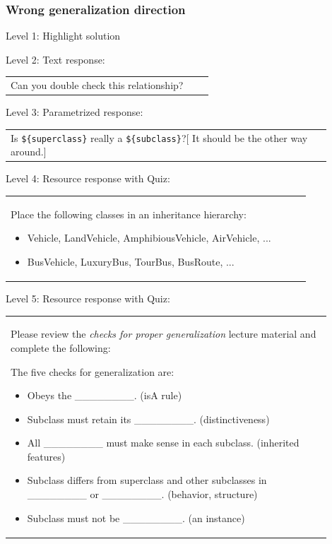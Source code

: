 \subsubsection{Wrong generalization direction}

\noindent Level 1: Highlight solution  \medskip

\noindent Level 2: Text response: \medskip

\begin{tabular}{|p{0.9\linewidth}}
Can you double check this relationship?
\end{tabular} \medskip

\noindent Level 3: Parametrized response: \medskip

\begin{tabular}{|p{0.9\linewidth}}
Is \verb|${superclass}| really a \verb|${subclass}|?[ It should be the other way around.]
\end{tabular} \medskip

\noindent Level 4: Resource response with Quiz: \medskip

\begin{tabular}{|p{0.9\linewidth}}
Place the following classes in an inheritance hierarchy:

\begin{itemize}
    \item Vehicle, LandVehicle, AmphibiousVehicle, AirVehicle, ...
    \item BusVehicle, LuxuryBus, TourBus, BusRoute, ...
\end{itemize}

\end{tabular} \medskip

\noindent Level 5: Resource response with Quiz: \medskip

\begin{tabular}{|p{0.9\linewidth}}
Please review the \textit{checks for proper generalization} lecture material
and complete the following:

The five checks for generalization are:
\begin{itemize}
    \item Obeys the \_\_\_\_\_\_\_\_. (isA rule)
    \item Subclass must retain its \_\_\_\_\_\_\_\_. (distinctiveness)
    \item All \_\_\_\_\_\_\_\_ must make sense in each subclass. (inherited features)
    \item Subclass differs from superclass and other subclasses in \_\_\_\_\_\_\_\_ or \_\_\_\_\_\_\_\_. (behavior, structure)
    \item Subclass must not be \_\_\_\_\_\_\_\_. (an instance)
\end{itemize}

\end{tabular} \medskip

